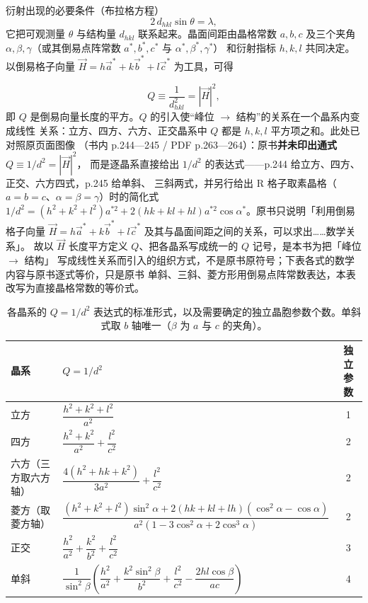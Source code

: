 \begin{principle}
衍射出现的必要条件（布拉格方程）
\begin{equation}
2\,d_{hkl}\sin\theta=\lambda ,
\label{eq:ch04b-bragg}
\end{equation}
它把可观测量 $\theta$ 与结构量 $d_{hkl}$ 联系起来。晶面间距由晶格常数 $a,b,c$ 及三个夹角
$\alpha,\beta,\gamma$（或其倒易点阵常数 $a^{*},b^{*},c^{*}$ 与 $\alpha^{*},\beta^{*},\gamma^{*}$）
和衍射指标 $h,k,l$ 共同决定。以倒易格子向量 $\vec{H}=h\vec{a}^{*}+k\vec{b}^{*}+l\vec{c}^{*}$
为工具，可得
 
\begin{equation}
Q\equiv\frac{1}{d_{hkl}^{2}}=\left|\vec{H}\right|^{2},
\label{eq:ch04b-Q}
\end{equation}
即 $Q$ 是倒易向量长度的平方。$Q$ 的引入使“峰位 $\rightarrow$ 结构”的关系在一个晶系内变成线性
关系：立方、四方、六方、正交晶系中 $Q$ 都是 $h,k,l$ 平方项之和。此处已对照原页面图像
（书内 p.244—245 / PDF p.263—264）：原书\textbf{并未印出通式} $Q\equiv1/d^{2}=|\vec{H}|^{2}$，
而是逐晶系直接给出 $1/d^{2}$ 的表达式——p.244 给立方、四方、正交、六方四式，p.245 给单斜、
三斜两式，并另行给出 R 格子取素晶格（$a=b=c$、$\alpha=\beta=\gamma$）时的简化式
$1/d^{2}=(h^{2}+k^{2}+l^{2})a^{*2}+2(hk+kl+hl)a^{*2}\cos\alpha^{*}$。原书只说明「利用倒易格子向量
$\vec{H}=h\vec{a}^{*}+k\vec{b}^{*}+l\vec{c}^{*}$ 及其与晶面间距之间的关系，可以求出……数学关系」。
故以 $\vec{H}$ 长度平方定义 $Q$、把各晶系写成统一的 $Q$ 记号，是本书为把「峰位 $\rightarrow$ 结构」
写成线性关系而引入的组织方式，不是原书原符号；下表各式的数学内容与原书逐式等价，只是原书
单斜、三斜、菱方形用倒易点阵常数表达，本表改写为直接晶格常数的等价式。
\end{principle}

\begin{table}[tbp]
  \centering
  \caption{各晶系的 $Q=1/d^{2}$ 表达式的标准形式，以及需要确定的独立晶胞参数个数。单斜式取
    $b$ 轴唯一（$\beta$ 为 $a$ 与 $c$ 的夹角）。}
  \label{tab:ch04b-Qtable}
  \begin{tabular}{@{}llc@{}}
    \toprule
    晶系 & $Q=1/d^{2}$ & 独立参数 \\
    \midrule
    立方 & $\dfrac{h^{2}+k^{2}+l^{2}}{a^{2}}$ & 1 \\
    四方 & $\dfrac{h^{2}+k^{2}}{a^{2}}+\dfrac{l^{2}}{c^{2}}$ & 2 \\
    六方（三方取六方轴） & $\dfrac{4(h^{2}+hk+k^{2})}{3a^{2}}+\dfrac{l^{2}}{c^{2}}$ & 2 \\
    菱方（取菱方轴） & $\dfrac{(h^{2}+k^{2}+l^{2})\sin^{2}\alpha+2(hk+kl+lh)(\cos^{2}\alpha-\cos\alpha)}
      {a^{2}(1-3\cos^{2}\alpha+2\cos^{3}\alpha)}$ & 2 \\
    正交 & $\dfrac{h^{2}}{a^{2}}+\dfrac{k^{2}}{b^{2}}+\dfrac{l^{2}}{c^{2}}$ & 3 \\
    单斜 & $\dfrac{1}{\sin^{2}\beta}\left(\dfrac{h^{2}}{a^{2}}+\dfrac{k^{2}\sin^{2}\beta}{b^{2}}
      +\dfrac{l^{2}}{c^{2}}-\dfrac{2hl\cos\beta}{ac}\right)$ & 4 \\
    \bottomrule
  \end{tabular}
\end{table}

